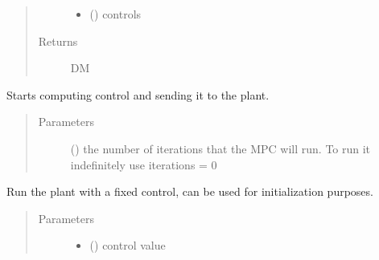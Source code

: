 \documentclass[letterpaper,10pt,english]{sphinxmanual}
\begin{document}
\begin{fulllineitems}
\begin{fulllineitems}
\begin{quote}
\begin{description}
\begin{itemize}
\item {} 
 () \textendash{} controls

\end{itemize}

\item[{Returns}] \leavevmode
DM

\end{description}\end{quote}

\end{fulllineitems}


\begin{fulllineitems}
\label{\detokenize{yaocptool.mpc:yaocptool.mpc.mpc.MPC.run}}
Starts computing control and sending it to the plant.
\begin{quote}\begin{description}
\item[{Parameters}] \leavevmode
{} () \textendash{} the number of iterations that the MPC will run. To run it indefinitely use iterations = 0

\end{description}\end{quote}

\end{fulllineitems}


\begin{fulllineitems}
\label{\detokenize{yaocptool.mpc:yaocptool.mpc.mpc.MPC.run_fixed_control}}
Run the plant with a fixed control, can be used for initialization purposes.
\begin{quote}\begin{description}
\item[{Parameters}] \leavevmode\begin{itemize}
\item {} 
 () \textendash{} control value


\end{itemize}
\end{description}
\end{quote}
\end{fulllineitems}
\end{fulllineitems}
\end{document}
